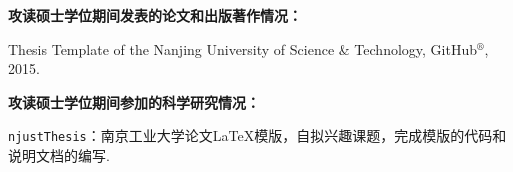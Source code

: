 \begin{publications}{99}
\item[] {\bf{攻读硕士学位期间发表的论文和出版著作情况：}}

\item Thesis Template of the Nanjing University of Science \& Technology, GitHub$^{\circledR}$, 2015.

\vspace{1.0cm}
\item[] {{\songti{}\bf{攻读硕士学位期间参加的科学研究情况：}}}
\setcounter{enumiv}{0}

\item \texttt{njustThesis}：南京工业大学论文\LaTeX{}模版，自拟兴趣课题，完成模版的代码和说明文档的编写.


\end{publications}
